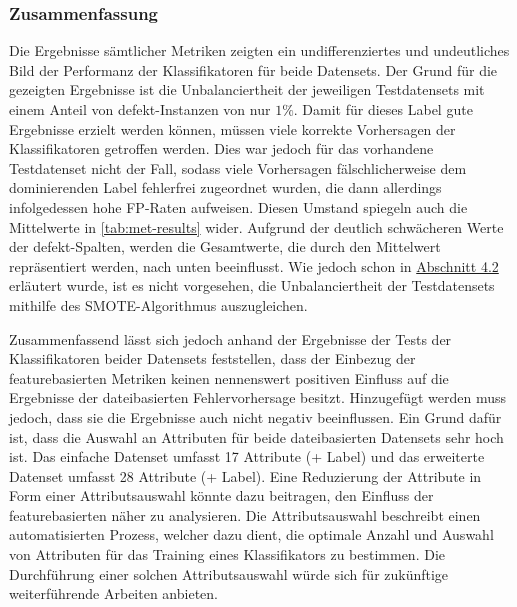 \subsubsection*{Zusammenfassung}
Die Ergebnisse sämtlicher Metriken zeigten ein undifferenziertes und undeutliches Bild der Performanz der Klassifikatoren für beide Datensets. Der Grund für die gezeigten Ergebnisse ist die Unbalanciertheit der jeweiligen Testdatensets mit einem Anteil von \glqq defekt\grqq -Instanzen von nur $1\%$. Damit für dieses Label gute Ergebnisse erzielt werden können, müssen viele korrekte Vorhersagen der Klassifikatoren getroffen werden. Dies war jedoch für das vorhandene Testdatenset nicht der Fall, sodass viele Vorhersagen fälschlicherweise dem dominierenden Label \glqq fehlerfrei\grqq{} zugeordnet wurden, die dann allerdings infolgedessen hohe FP-Raten aufweisen. Diesen Umstand spiegeln auch die Mittelwerte in \autoref{tab:met-results} wider. Aufgrund der deutlich schwächeren Werte der \glqq defekt\grqq -Spalten, werden die Gesamtwerte, die durch den Mittelwert repräsentiert werden, nach unten beeinflusst. Wie jedoch schon in \hyperref[smote]{Abschnitt 4.2} erläutert wurde, ist es nicht vorgesehen, die Unbalanciertheit der Testdatensets mithilfe des SMOTE-Algorithmus auszugleichen.

Zusammenfassend lässt sich jedoch anhand der Ergebnisse der Tests der Klassifikatoren beider Datensets feststellen, dass der Einbezug der featurebasierten Metriken keinen nennenswert positiven Einfluss auf die Ergebnisse der dateibasierten Fehlervorhersage besitzt. Hinzugefügt werden muss jedoch, dass sie die Ergebnisse auch nicht negativ beeinflussen. Ein Grund dafür ist, dass die Auswahl an Attributen für beide dateibasierten Datensets sehr hoch ist. Das \glqq einfache\grqq{} Datenset umfasst 17 Attribute (+ Label) und das erweiterte Datenset umfasst 28 Attribute (+ Label). Eine Reduzierung der Attribute in Form einer Attributsauswahl könnte dazu beitragen, den Einfluss der featurebasierten näher zu analysieren. Die Attributsauswahl beschreibt einen automatisierten Prozess, welcher dazu dient, die optimale Anzahl und Auswahl von Attributen für das Training eines Klassifikators zu bestimmen. Die Durchführung einer solchen Attributsauswahl würde sich für zukünftige weiterführende Arbeiten anbieten.


